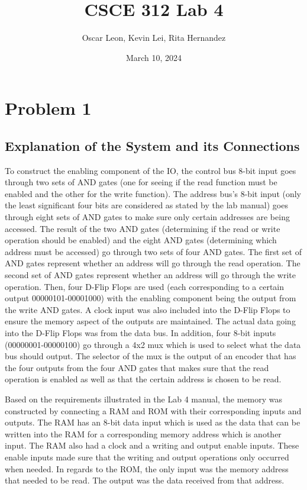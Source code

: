 \documentclass{article}
\title{CSCE 312 Lab 4}
\author{Oscar Leon, Kevin Lei, Rita Hernandez}
\date{March 10, 2024}
\begin{document}
\maketitle
\subsection*{}

\section*{Problem 1}
\subsection*{Explanation of the System and its Connections}
To construct the enabling component of the IO, the control bus 8-bit input goes through two sets of AND gates (one for seeing if the read function must be enabled and the other for the write function). 
The address bus's 8-bit input (only the least significant four bits are considered as stated by the lab manual) goes through eight sets of AND gates to make sure only certain addresses are being accessed.
The result of the two AND gates (determining if the read or write operation should be enabled) and the eight AND gates (determining which address must be accessed) go through two sets of four AND gates.
The first set of AND gates represent whether an address will go through the read operation.
The second set of AND gates represent whether an address will go through the write operation.
Then, four D-Flip Flops are used (each corresponding to a certain output 00000101-00001000) with the enabling component being the output from the write AND gates.
A clock input was also included into the D-Flip Flops to ensure the memory aspect of the outputs are maintained.
The actual data going into the D-Flip Flops was from the data bus. In addition, four 8-bit inputs (00000001-00000100) go through a 4x2 mux which is used to select what the data bus should output.
The selector of the mux is the output of an encoder that has the four outputs from the four AND gates that makes sure that the read operation is enabled as well as that the certain address is chosen to be read. 

Based on the requirements illustrated in the Lab 4 manual, the memory was constructed by connecting a RAM and ROM with their corresponding inputs and outputs. 
The RAM has an 8-bit data input which is used as the data that can be written into the RAM for a corresponding memory address which is another input. 
The RAM also had a clock and a writing and output enable inputs. 
These enable inputs made sure that the writing and output operations only occurred when needed. 
In regards to the ROM, the only input was the memory address that needed to be read. 
The output was the data received from that address.
\end{document}
